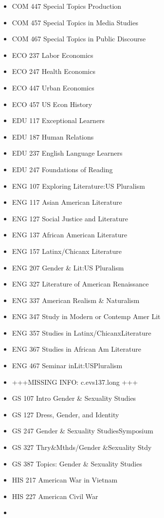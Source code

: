 \documentclass[
  letterpaper,
]{scrbook}
\begin{document}
\begin{itemize}
\item
  COM 447 Special Topics Production
\item
  COM 457 Special Topics in Media Studies
\item
  COM 467 Special Topics in Public Discourse
\item
  ECO 237 Labor Economics
\item
  ECO 247 Health Economics
\item
  ECO 447 Urban Economics
\item
  ECO 457 US Econ History
\item
  EDU 117 Exceptional Learners
\item
  EDU 187 Human Relations
\item
  EDU 237 English Language Learners
\item
  EDU 247 Foundations of Reading
\item
  ENG 107 Exploring Literature:US Pluralism
\item
  ENG 117 Asian American Literature
\item
  ENG 127 Social Justice and Literature
\item
  ENG 137 African American Literature
\item
  ENG 157 Latinx/Chicanx Literature
\item
  ENG 207 Gender \& Lit:US Pluralism
\item
  ENG 327 Literature of American Renaissance
\item
  ENG 337 American Realism \& Naturalism
\item
  ENG 347 Study in Modern or Contemp Amer Lit
\item
  ENG 357 Studies in Latinx/ChicanxLiterature
\item
  ENG 367 Studies in African Am Literature
\item
  ENG 467 Seminar inLit:USPluralism
\item
  +++MISSING INFO: c.evs137.long +++
\item
  GS 107 Intro Gender \& Sexuality Studies
\item
  GS 127 Dress, Gender, and Identity
\item
  GS 247 Gender \& Sexuality StudiesSymposium
\item
  GS 327 Thry\&Mthds/Gender \&Sexuality Stdy
\item
  GS 387 Topics: Gender \& Sexuality Studies
\item
  HIS 217 American War in Vietnam
\item
  HIS 227 American Civil War
\item

\end{itemize}
\end{document}
